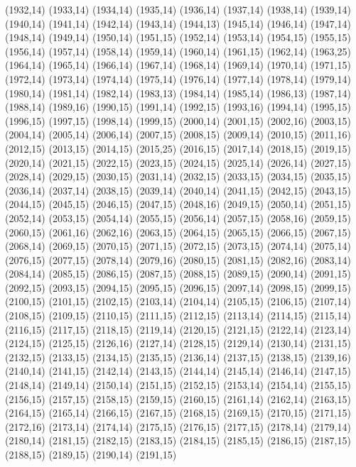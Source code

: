 (1932,14)
(1933,14)
(1934,14)
(1935,14)
(1936,14)
(1937,14)
(1938,14)
(1939,14)
(1940,14)
(1941,14)
(1942,14)
(1943,14)
(1944,13)
(1945,14)
(1946,14)
(1947,14)
(1948,14)
(1949,14)
(1950,14)
(1951,15)
(1952,14)
(1953,14)
(1954,15)
(1955,15)
(1956,14)
(1957,14)
(1958,14)
(1959,14)
(1960,14)
(1961,15)
(1962,14)
(1963,25)
(1964,14)
(1965,14)
(1966,14)
(1967,14)
(1968,14)
(1969,14)
(1970,14)
(1971,15)
(1972,14)
(1973,14)
(1974,14)
(1975,14)
(1976,14)
(1977,14)
(1978,14)
(1979,14)
(1980,14)
(1981,14)
(1982,14)
(1983,13)
(1984,14)
(1985,14)
(1986,13)
(1987,14)
(1988,14)
(1989,16)
(1990,15)
(1991,14)
(1992,15)
(1993,16)
(1994,14)
(1995,15)
(1996,15)
(1997,15)
(1998,14)
(1999,15)
(2000,14)
(2001,15)
(2002,16)
(2003,15)
(2004,14)
(2005,14)
(2006,14)
(2007,15)
(2008,15)
(2009,14)
(2010,15)
(2011,16)
(2012,15)
(2013,15)
(2014,15)
(2015,25)
(2016,15)
(2017,14)
(2018,15)
(2019,15)
(2020,14)
(2021,15)
(2022,15)
(2023,15)
(2024,15)
(2025,14)
(2026,14)
(2027,15)
(2028,14)
(2029,15)
(2030,15)
(2031,14)
(2032,15)
(2033,15)
(2034,15)
(2035,15)
(2036,14)
(2037,14)
(2038,15)
(2039,14)
(2040,14)
(2041,15)
(2042,15)
(2043,15)
(2044,15)
(2045,15)
(2046,15)
(2047,15)
(2048,16)
(2049,15)
(2050,14)
(2051,15)
(2052,14)
(2053,15)
(2054,14)
(2055,15)
(2056,14)
(2057,15)
(2058,16)
(2059,15)
(2060,15)
(2061,16)
(2062,16)
(2063,15)
(2064,15)
(2065,15)
(2066,15)
(2067,15)
(2068,14)
(2069,15)
(2070,15)
(2071,15)
(2072,15)
(2073,15)
(2074,14)
(2075,14)
(2076,15)
(2077,15)
(2078,14)
(2079,16)
(2080,15)
(2081,15)
(2082,16)
(2083,14)
(2084,14)
(2085,15)
(2086,15)
(2087,15)
(2088,15)
(2089,15)
(2090,14)
(2091,15)
(2092,15)
(2093,15)
(2094,15)
(2095,15)
(2096,15)
(2097,14)
(2098,15)
(2099,15)
(2100,15)
(2101,15)
(2102,15)
(2103,14)
(2104,14)
(2105,15)
(2106,15)
(2107,14)
(2108,15)
(2109,15)
(2110,15)
(2111,15)
(2112,15)
(2113,14)
(2114,15)
(2115,14)
(2116,15)
(2117,15)
(2118,15)
(2119,14)
(2120,15)
(2121,15)
(2122,14)
(2123,14)
(2124,15)
(2125,15)
(2126,16)
(2127,14)
(2128,15)
(2129,14)
(2130,14)
(2131,15)
(2132,15)
(2133,15)
(2134,15)
(2135,15)
(2136,14)
(2137,15)
(2138,15)
(2139,16)
(2140,14)
(2141,15)
(2142,14)
(2143,15)
(2144,14)
(2145,14)
(2146,14)
(2147,15)
(2148,14)
(2149,14)
(2150,14)
(2151,15)
(2152,15)
(2153,14)
(2154,14)
(2155,15)
(2156,15)
(2157,15)
(2158,15)
(2159,15)
(2160,15)
(2161,14)
(2162,14)
(2163,15)
(2164,15)
(2165,14)
(2166,15)
(2167,15)
(2168,15)
(2169,15)
(2170,15)
(2171,15)
(2172,16)
(2173,14)
(2174,14)
(2175,15)
(2176,15)
(2177,15)
(2178,14)
(2179,14)
(2180,14)
(2181,15)
(2182,15)
(2183,15)
(2184,15)
(2185,15)
(2186,15)
(2187,15)
(2188,15)
(2189,15)
(2190,14)
(2191,15)
